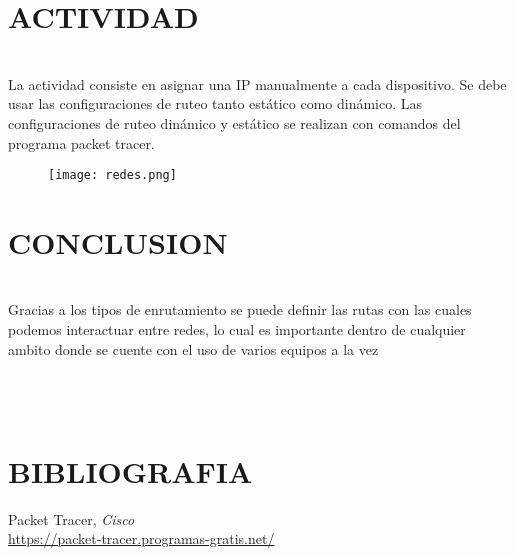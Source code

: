 \documentclass[onecolumn,12pt]{IEEEtran}
\begin{document}
\section{ACTIVIDAD}
\hfill \\

La actividad consiste en asignar una IP manualmente a cada dispositivo. Se debe usar las configuraciones de ruteo tanto estático como dinámico. Las configuraciones de ruteo dinámico y estático se realizan con comandos del programa packet tracer.


\begin{figure}[h]
\begin{center}
\texttt{[image: redes.png]}
\label{fig:mesh1}
\end{center}
\end{figure}


\section{CONCLUSION}
\hfill \\
Gracias a los tipos de enrutamiento se puede definir las rutas con las cuales podemos interactuar entre redes, lo cual es importante dentro de cualquier ambito donde se cuente con el uso de varios equipos a la vez


\hfill \\
\hfill \\
\section{BIBLIOGRAFIA}

Packet Tracer,
\emph{Cisco} \\
\url{https://packet-tracer.programas-gratis.net/} \\
\end{document}
